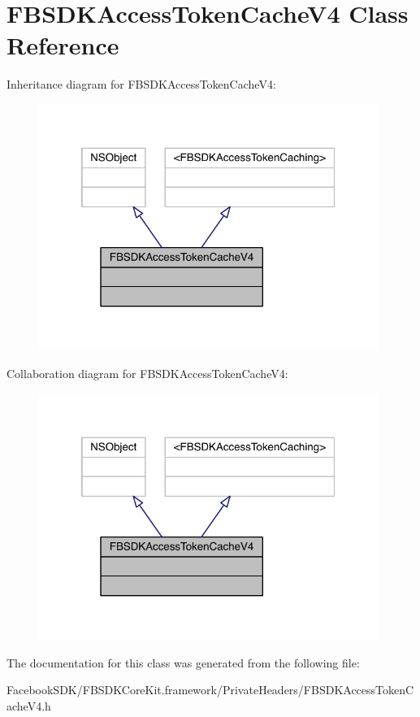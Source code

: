 \hypertarget{interface_f_b_s_d_k_access_token_cache_v4}{\section{F\-B\-S\-D\-K\-Access\-Token\-Cache\-V4 Class Reference}
\label{interface_f_b_s_d_k_access_token_cache_v4}
}


Inheritance diagram for F\-B\-S\-D\-K\-Access\-Token\-Cache\-V4\-:
\nopagebreak
\begin{figure}[H]
\begin{center}
\leavevmode
\includegraphics[width=313pt]{interface_f_b_s_d_k_access_token_cache_v4__inherit__graph}
\end{center}
\end{figure}


Collaboration diagram for F\-B\-S\-D\-K\-Access\-Token\-Cache\-V4\-:
\nopagebreak
\begin{figure}[H]
\begin{center}
\leavevmode
\includegraphics[width=313pt]{interface_f_b_s_d_k_access_token_cache_v4__coll__graph}
\end{center}
\end{figure}


The documentation for this class was generated from the following file\-:\begin{DoxyCompactItemize}
\item 
Facebook\-S\-D\-K/\-F\-B\-S\-D\-K\-Core\-Kit.\-framework/\-Private\-Headers/F\-B\-S\-D\-K\-Access\-Token\-Cache\-V4.\-h\end{DoxyCompactItemize}
